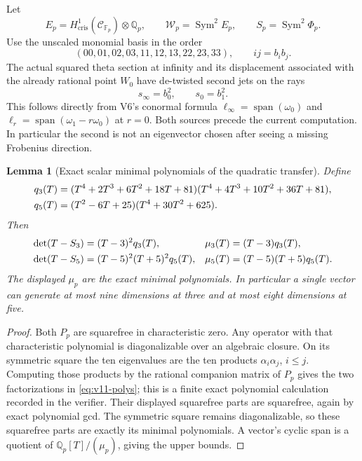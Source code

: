 \documentclass[11pt]{article}
\newtheorem{lemma}[lemma]{Lemma}
\theoremstyle{definition}
\theoremstyle{remark}
\newcommand{\F}{\mathbb F}
\newcommand{\Q}{\mathbb Q}
\newcommand{\Span}{\operatorname{span}}
\begin{document}
Let
\[
 E_p=H^1_{\mathrm{cris}}(\mathcal C_{\F_p})\otimes\Q_p,
 \qquad\mathcal W_p=\operatorname{Sym}^2E_p,
 \qquad S_p=\operatorname{Sym}^2\Phi_p.
\]
Use the unscaled monomial basis in the order
\begin{equation}
 (00,01,02,03,11,12,13,22,23,33),\qquad ij=b_ib_j.
 \label{eq:v11-symbasis}
\end{equation}
The actual squared theta section at infinity and its displacement
associated with the already rational point $W_0$ have de-twisted
second jets on the rays
\begin{equation}
 \boxed{s_\infty=b_0^2,
 \qquad s_0=b_1^2.}
 \label{eq:v11-sources}
\end{equation}
This follows directly from V6's conormal formula
$\ell_\infty=\Span(\omega_0)$ and
$\ell_r=\Span(\omega_1-r\omega_0)$ at $r=0$. Both sources precede
the current computation. In particular the second is not an eigenvector
chosen after seeing a missing Frobenius direction.

\begin{lemma}[Exact scalar minimal polynomials of the quadratic transfer]
\label{lem:v11-minpoly}
Define
\begin{align}
 q_3(T)&=(T^4+2T^3+6T^2+18T+81)
          (T^4+4T^3+10T^2+36T+81),\notag\\
 q_5(T)&=(T^2-6T+25)(T^4+30T^2+625).
 \label{eq:v11-q}
\end{align}
Then
\begin{align}
 \det(T-S_3)&=(T-3)^2q_3(T),&
 \mu_3(T)&=(T-3)q_3(T),\notag\\
 \det(T-S_5)&=(T-5)^2(T+5)^2q_5(T),&
 \mu_5(T)&=(T-5)(T+5)q_5(T).
 \label{eq:v11-polys}
\end{align}
The displayed $\mu_p$ are the exact minimal polynomials. In particular
a single vector can generate at most nine dimensions at three and at
most eight dimensions at five.
\end{lemma}
\begin{proof}
Both $P_p$ are squarefree in characteristic zero. Any operator with
that characteristic polynomial is diagonalizable over an algebraic
closure. On its symmetric square the ten eigenvalues are the ten
products $\alpha_i\alpha_j$, $i\le j$. Computing those products by
the rational companion matrix of $P_p$ gives the two factorizations
in \cref{eq:v11-polys}; this is a finite exact polynomial calculation
recorded in the verifier. Their displayed squarefree parts are
squarefree, again by exact polynomial gcd. The symmetric square remains
diagonalizable, so these squarefree parts are exactly its minimal
polynomials. A vector's cyclic span is a quotient of
$\Q_p[T]/(\mu_p)$, giving the upper bounds.
\end{proof}
\end{document}
